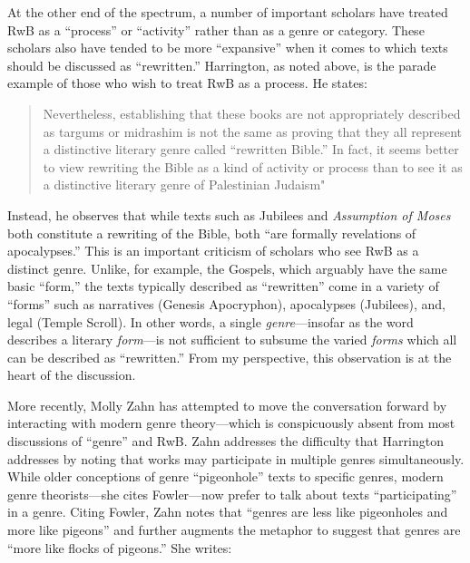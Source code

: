 At the other end of the spectrum, a number of important scholars have
treated RwB as a ``process'' or ``activity'' rather than as a genre or
category. These scholars also have tended to be more ``expansive'' when
it comes to which texts should be discussed as ``rewritten.''
Harrington, as noted above, is the parade example of those who wish to
treat RwB as a process. He states:

\begin{quote}
Nevertheless, establishing that these books are not appropriately
described as targums or midrashim is not the same as proving that they
all represent a distinctive literary genre called ``rewritten Bible.''
In fact, it seems better to view rewriting the Bible as a kind of
activity or process than to see it as a distinctive literary genre of
Palestinian
Judaism"\autocite[242--243]{harrington_kraft-nickelsburg1986}
\end{quote}

Instead, he observes that while texts such as Jubilees and
\emph{Assumption of Moses} both constitute a rewriting of the Bible,
both ``are formally revelations of
apocalypses.''\autocite[243]{harrington_kraft-nickelsburg1986} This is
an important criticism of scholars who see RwB as a distinct genre.
Unlike, for example, the Gospels, which arguably have the same basic
``form,'' the texts typically described as ``rewritten'' come in a
variety of ``forms'' such as narratives (Genesis Apocryphon),
apocalypses (Jubilees), and, legal (Temple Scroll). In other words, a
single \emph{genre}---insofar as the word describes a literary
\emph{form}---is not sufficient to subsume the varied \emph{forms} which
all can be described as ``rewritten.'' From my perspective, this
observation is at the heart of the discussion.

More recently, Molly Zahn has attempted to move the conversation forward
by interacting with modern genre theory---which is conspicuously absent
from most discussions of ``genre'' and
RwB.\autocites{zahn_jbl2012}[Daniel Machiela noted the absence of genre
theory in his 2010 article, as well, see][]{machiela_jjs2010}[Notable
exceptions include][]{brooke_dsd2010} Zahn addresses the difficulty that
Harrington addresses by noting that works may participate in multiple
genres simultaneously. While older conceptions of genre ``pigeonhole''
texts to specific genres, modern genre theorists---she cites
Fowler---now prefer to talk about texts ``participating'' in a genre.
Citing Fowler, Zahn notes that ``genres are less like pigeonholes and
more like pigeons'' and further augments the metaphor to suggest that
genres are ``more like flocks of pigeons.'' She writes:

